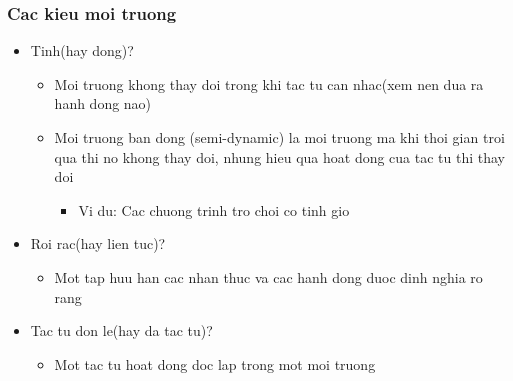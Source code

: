\documentclass[12pt]{beamer}
\begin{document}
\begin{frame}
\frametitle{Cac kieu moi truong}
\begin{itemize}
    \item Tinh(hay dong)?\\
    \begin{itemize}
        \item Moi truong khong thay doi trong khi tac tu can nhac(xem nen dua ra hanh dong nao)\\
        \item Moi truong ban dong (semi-dynamic) la moi truong ma khi thoi gian troi qua thi no khong thay doi, nhung hieu qua hoat dong cua tac tu thi thay doi\\    
        \begin{itemize}
            \item Vi du: Cac chuong trinh tro choi co tinh gio\\
        \end{itemize}
    \end{itemize}
    \item Roi rac(hay lien tuc)?\\
    \begin{itemize}
        \item Mot tap huu han cac nhan thuc va cac hanh dong duoc dinh nghia ro rang\\
    \end{itemize}
    \item Tac tu don le(hay da tac tu)?\\
    \begin{itemize}
        \item Mot tac tu hoat dong doc lap trong mot moi truong\\
    \end{itemize}
    \end{itemize}
\end{frame}
\end{document}
